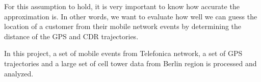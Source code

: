 For this assumption to hold, it is very important to know how accurate the approximation is. In other words, we want to evaluate how well we can guess the location of a customer from their mobile network events by determining the distance of the GPS and CDR trajectories.

In this project, a set of mobile events from Telefonica network, a set of GPS trajectories and a large set of cell tower data from Berlin region is processed and analyzed. 



